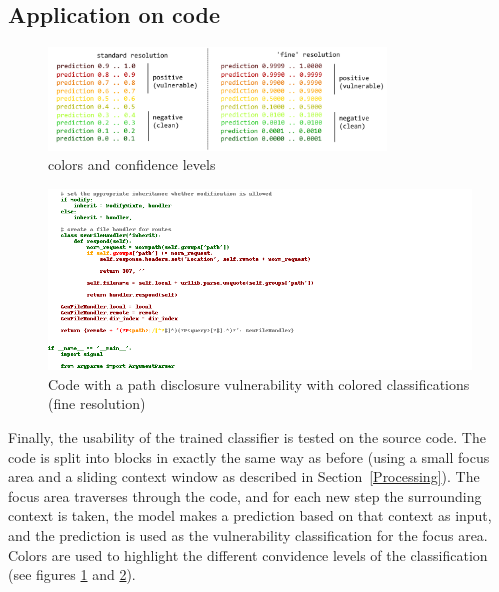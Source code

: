 \documentclass[
a4paper,
pagesize,
pdftex,
12pt,
twoside, %
BCOR=5mm, %
ngerman,
fleqn,
final,
]{scrartcl}
\begin{document}
	\subsection{Application on code}
	\begin{figure}[h]
		\centering
		\includegraphics[width=0.8\textwidth]{img/colorkey.png}
		\caption{colors and confidence levels}
		\label{fig:colors}
	\end{figure}
	
	\begin{figure}[h]
		\centering
		\includegraphics[width=1\textwidth]{img/examplePathDisclosure.png}
		\caption{Code with a path disclosure vulnerability with colored classifications (fine resolution)}
		\label{fig:example}
	\end{figure}
	Finally, the usability of the trained classifier is tested on the source code. The code is split into blocks in exactly the same way as before (using a small focus area and a sliding context window as described in Section~\ref{Processing}). The focus area traverses through the code, and for each new step the surrounding context is taken, the model makes a prediction based on that context as input, and the prediction is used as the vulnerability classification for the focus area. Colors are used to highlight the different convidence levels of the classification (see figures \ref{fig:colors} and \ref{fig:example}).\\	
\end{document}

